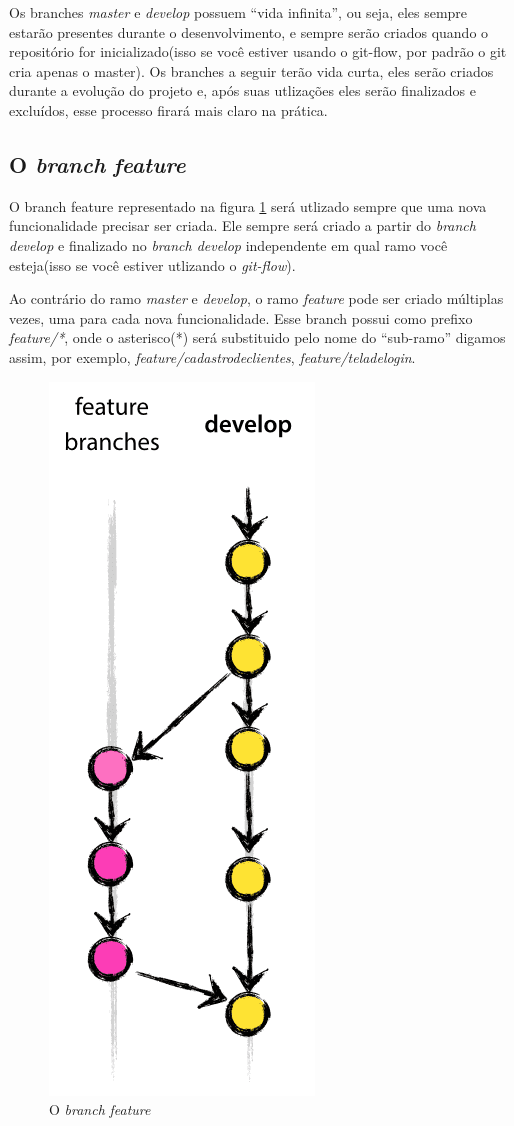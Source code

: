 \documentclass[12pt,openright,oneside,a4paper,english,brazil]{abntex2}
\begin{document}
Os branches \textit{master} e \textit{develop} possuem ``vida infinita'', ou seja, eles sempre estarão presentes durante o desenvolvimento, e sempre serão criados quando o repositório for inicializado(isso se você estiver usando o git-flow, por padrão o git cria apenas o master). Os branches a seguir terão vida curta, eles serão criados durante a evolução do projeto e, após suas utlizações eles serão finalizados e excluídos, esse processo firará mais claro na prática.

\subsection{O \textit{branch} \textit{feature}}

O branch feature representado na figura \ref{feature} será utlizado sempre que uma nova funcionalidade precisar ser criada. Ele sempre será criado a partir do\textit{ branch develop} e finalizado no \textit{branch develop} independente em qual ramo você esteja(isso se você estiver utlizando o \textit{git-flow}).

Ao contrário do ramo \textit{master} e \textit{develop}, o ramo \textit{feature} pode ser criado múltiplas vezes, uma para cada nova funcionalidade. Esse branch possui como prefixo \textit{feature/*}, onde o asterisco(*) será substituido pelo nome do ``sub-ramo'' digamos assim, por exemplo, \textit{feature/cadastrodeclientes}, \textit{feature/teladelogin}.

\begin{figure}[h]
	\caption{\label{feature}O \textit{branch} \textit{feature}}
	\begin{center}
		\includegraphics[width=0.26\linewidth]{imagens/feature}
	\end{center}
\end{figure}
\end{document}

